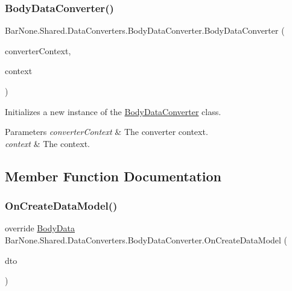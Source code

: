 \subsubsection{\texorpdfstring{Body\+Data\+Converter()}{BodyDataConverter()}}
{\footnotesize\ttfamily Bar\+None.\+Shared.\+Data\+Converters.\+Body\+Data\+Converter.\+Body\+Data\+Converter (\begin{DoxyParamCaption}\item[{\mbox{\hyperlink{class_bar_none_1_1_shared_1_1_data_converters_1_1_converters}{Converters}}}]{converter\+Context,  }\item[{\mbox{\hyperlink{interface_bar_none_1_1_shared_1_1_core_1_1_i_domain_context}{I\+Domain\+Context}}}]{context }\end{DoxyParamCaption})}



Initializes a new instance of the \mbox{\hyperlink{class_bar_none_1_1_shared_1_1_data_converters_1_1_body_data_converter}{Body\+Data\+Converter}} class. 


\begin{DoxyParams}{Parameters}
{\em converter\+Context} & The converter context.\\
\hline
{\em context} & The context.\\
\hline
\end{DoxyParams}


\subsection{Member Function Documentation}
\mbox{\label{class_bar_none_1_1_shared_1_1_data_converters_1_1_body_data_converter_a07e8157284ed612bb9aad36be2b4c534}} 
\subsubsection{\texorpdfstring{On\+Create\+Data\+Model()}{OnCreateDataModel()}}
{\footnotesize\ttfamily override \mbox{\hyperlink{class_bar_none_1_1_shared_1_1_domain_model_1_1_body_data}{Body\+Data}} Bar\+None.\+Shared.\+Data\+Converters.\+Body\+Data\+Converter.\+On\+Create\+Data\+Model (\begin{DoxyParamCaption}\item[{\mbox{\hyperlink{class_bar_none_1_1_shared_1_1_data_transfer_1_1_body_data_d_t_o}{Body\+Data\+D\+TO}}}]{dto }\end{DoxyParamCaption})}



